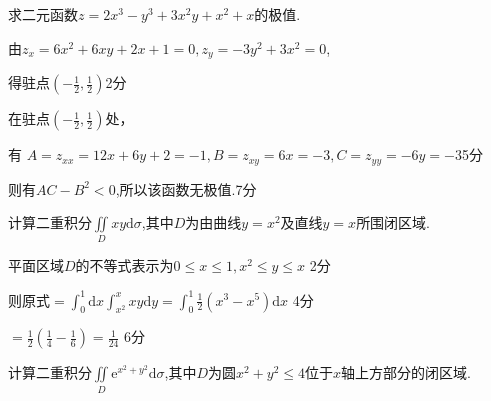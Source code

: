 \documentclass{NBUTExam}
\renewcommand{\d}{\mathrm{d}}
\newcommand{\e}{\mathrm{e}}
\newcommand{\dis}{\displaystyle}
\begin{document}
\vspace{12em}
\begin{problem}
求二元函数$z=2x^3-y^3+3x^2y+x^2+x$的极值.
\end{problem}
\vspace{1em}
\begin{solution}
由$\dis z_x=6x^2+6xy+2x+1=0,z_y=-3y^2+3x^2=0$,\par
\vspace{0.5em}
得驻点$\dis (-\frac{1}{2},\frac{1}{2})$\dotfill 2分 \par
\vspace{0.5em}
在驻点$\dis (-\frac{1}{2},\frac{1}{2})$处，\par
\vspace{0.5em}
有 $A=z_{xx}=12x+6y+2=-1,B=z_{xy}=6x=-3,C=z_{yy}=-6y=-3$\dotfill 5分\par
\vspace{0.5em}
则有$AC-B^2<0$,所以该函数无极值.\dotfill 7分 \par
\end{solution}

\newpage
{}

\begin{problem}
计算二重积分$\dis \iint\limits_D{xy\mathrm{d}\sigma}$,其中$D$为由曲线$y=x^2$及直线$y=x$所围闭区域.
\end{problem}
\vspace{0.5em}

\begin{solution}
平面区域$D$的不等式表示为$0\leqslant x\leqslant 1,x^2\leqslant y \leqslant x$
 \dotfill 2分 \par
\vspace{0.5em}

则原式$\dis =\int_0^1\d x\int_{x^2}^x xy\d y =\int_0^1 \frac{1}{2}(x^3-x^5)\d x$ \dotfill 4分 \par
\vspace{0.5em}
\qquad \quad $\dis =\frac{1}{2}\left(\frac{1}{4}-\frac{1}{6}\right)=\frac{1}{24}$ \dotfill 6分 \par
\end{solution}
\vspace{17em}

\begin{problem}
计算二重积分$\dis \iint\limits_D{\e^{x^2+y^2}\d\sigma}$,其中$D$为圆$x^2+y^2\leqslant 4$位于$x$轴上方部分的闭区域.
\end{problem}
\vspace{0.5em}
\end{document}
